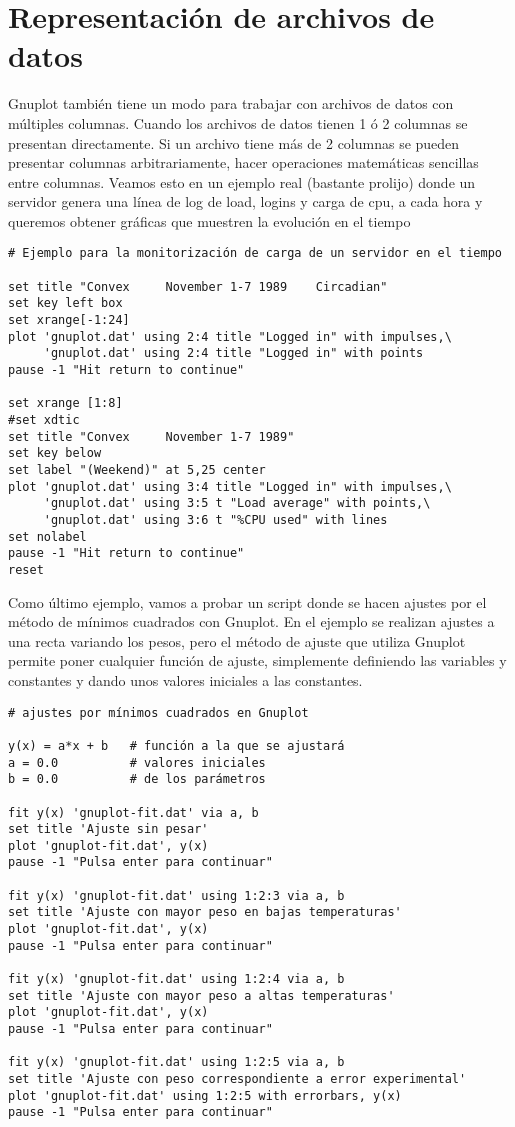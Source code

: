 \section{Representación de archivos de datos}

 Gnuplot  también tiene un  modo para trabajar con  archivos de
datos con múltiples columnas. Cuando los  archivos de datos tienen 1 ó
2  columnas  se  presentan  directamente.  Si  un  archivo  tiene  más
de  2 columnas  se  pueden presentar  columnas arbitrariamente,  hacer
operaciones matemáticas  sencillas entre  columnas. Veamos esto  en un
ejemplo real (bastante prolijo) donde  un servidor genera una línea de
log de  load, logins y  carga de cpu, a  cada hora y  queremos obtener
gráficas que muestren la evolución en el tiempo 

\begin{verbatim}
# Ejemplo para la monitorización de carga de un servidor en el tiempo

set title "Convex     November 1-7 1989    Circadian"
set key left box
set xrange[-1:24]
plot 'gnuplot.dat' using 2:4 title "Logged in" with impulses,\
     'gnuplot.dat' using 2:4 title "Logged in" with points
pause -1 "Hit return to continue"

set xrange [1:8]
#set xdtic
set title "Convex     November 1-7 1989"
set key below
set label "(Weekend)" at 5,25 center
plot 'gnuplot.dat' using 3:4 title "Logged in" with impulses,\
     'gnuplot.dat' using 3:5 t "Load average" with points,\
     'gnuplot.dat' using 3:6 t "%CPU used" with lines
set nolabel
pause -1 "Hit return to continue"
reset
\end{verbatim}

 Como último  ejemplo, vamos a probar un script  donde se hacen
ajustes por el método de mínimos  cuadrados con Gnuplot. En el ejemplo
se realizan ajustes a una recta  variando los pesos, pero el método de
ajuste que utiliza Gnuplot permite  poner cualquier función de ajuste,
simplemente definiendo las variables y constantes y dando unos valores
iniciales a las constantes. 

\begin{verbatim}
# ajustes por mínimos cuadrados en Gnuplot 

y(x) = a*x + b   # función a la que se ajustará
a = 0.0          # valores iniciales
b = 0.0          # de los parámetros

fit y(x) 'gnuplot-fit.dat' via a, b
set title 'Ajuste sin pesar'
plot 'gnuplot-fit.dat', y(x)
pause -1 "Pulsa enter para continuar"

fit y(x) 'gnuplot-fit.dat' using 1:2:3 via a, b
set title 'Ajuste con mayor peso en bajas temperaturas'
plot 'gnuplot-fit.dat', y(x)
pause -1 "Pulsa enter para continuar"

fit y(x) 'gnuplot-fit.dat' using 1:2:4 via a, b
set title 'Ajuste con mayor peso a altas temperaturas'
plot 'gnuplot-fit.dat', y(x)
pause -1 "Pulsa enter para continuar"

fit y(x) 'gnuplot-fit.dat' using 1:2:5 via a, b
set title 'Ajuste con peso correspondiente a error experimental'
plot 'gnuplot-fit.dat' using 1:2:5 with errorbars, y(x)
pause -1 "Pulsa enter para continuar"
\end{verbatim}


